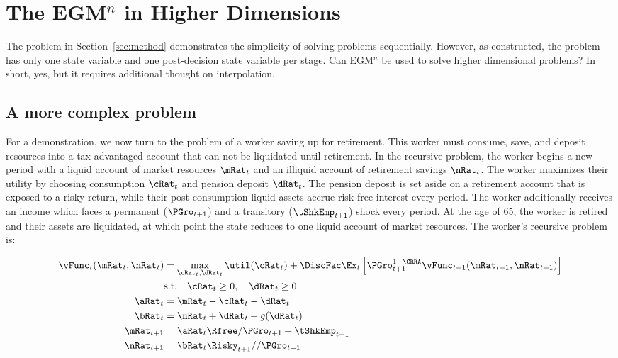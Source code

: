 \documentclass[\econtexRoot/SequentialEGM]{subfiles}
\begin{document}
\hypertarget{higher-dimensions}{}
\par\section{The EGM$^n$ in Higher Dimensions}
\notinsubfile{\label{sec:higherdims}}

The problem in Section~\ref{sec:method} demonstrates the simplicity of solving problems sequentially. However, as constructed, the problem has only one state variable and one post-decision state variable per stage. Can EGM$^n$ be used to solve higher dimensional problems? In short, yes, but it requires additional thought on interpolation.

\subsection{A more complex problem}

For a demonstration, we now turn to the problem of a worker saving up for retirement. This worker must consume, save, and deposit resources into a tax-advantaged account that can not be liquidated until retirement. In the recursive problem, the worker begins a new period with a liquid account of market resources $\mRat_{t}$ and an illiquid account of retirement savings $\nRat_{t}$. The worker maximizes their utility by choosing consumption $\cRat_{t}$ and pension deposit $\dRat_{t}$. The pension deposit is set aside on a retirement account that is exposed to a risky return, while their post-consumption liquid assets accrue risk-free interest every period. The worker additionally receives an income which faces a permanent ($\PGro_{t+1}$) and a transitory ($\tShkEmp_{t+1}$) shock every period. At the age of 65, the worker is retired and their assets are liquidated, at which point the state reduces to one liquid account of market resources. The worker's recursive problem is:

\begin{equation}
	\begin{split}
		\vFunc_{t}(\mRat_{t}, \nRat_{t}) & = \max_{\cRat_{t}, \dRat_{t}} \util(\cRat_{t}) + \DiscFac \Ex_{t} \left[ \PGro_{t+1}^{1-\CRRA} \vFunc_{t+1}(\mRat_{t+1}, \nRat_{t+1}) \right] \\
		& \text{s.t.} \quad \cRat_{t} \ge 0, \quad \dRat_{t} \ge 0 \\
		\aRat_{t} & = \mRat_{t} - \cRat_{t} - \dRat_{t} \\
		\bRat_{t} & = \nRat_{t} + \dRat_{t} + g(\dRat_{t}) \\
		\mRat_{t+1} & = \aRat_{t} \Rfree / \PGro_{t+1}  + \tShkEmp_{t+1} \\
		\nRat_{t+1} & = \bRat_{t} \Risky_{t+1} / / \PGro_{t+1}
	\end{split}
\end{equation}
\end{document}
